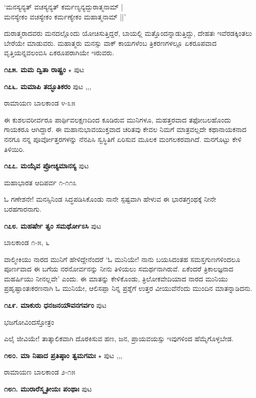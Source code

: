 {\begin{shloka}
`ಮನಸ್ಯನ್ಯತ್ ವಚಸ್ಯನ್ಯತ್ ಕರ್ಮಣ್ಯನ್ಯದ್ದುರಾತ್ಮನಾಮ್ |\\
ಮನಸ್ಯೇಕಂ ವಚಸ್ಯೇಕಂ ಕರ್ಮಣ್ಯೇಕಂ ಮಹಾತ್ಮನಾಮ್ ||'
\end{shloka}

ದುರಾತ್ಮರಾದವರು ಮನದಲ್ಲೊಂದು ಯೋಚಿಸುತ್ತಿದ್ದರೆ, ಬಾಯಲ್ಲಿ ಮತ್ತೊಂದನ್ನಾಡುತ್ತಿದ್ದು, ದೇಹತಃ ಇವೆರಡಕ್ಕಿಂತಲು ಬೇರೆಯೇ ಮಾಡುವರು. ಮಹಾತ್ಮರು ಮನಸ್ಸು ವಾಕ್ ಕಾಯಗಳೆಂಬ ತ್ರಿಕರಣಗಳಲ್ಲೂ ಏಕರೂಪವಾದ ವೃತ್ತಿಯನ್ನವಲಂಬಿಸಿ ಏಕರೂಪರಾಗಿಯೇ ಇರುವರು.

\medskip
\noindent\textbf{೧೭೫. ಮಮ ದ್ವಿತಾ ರಾಷ್ಟ್ರಂ} $\star$ \hfill ಪುಟ \pageref{148}

\medskip
\noindent\textbf{೧೭೬. ಮಮಾಪಿ ತದ್ಭೂತಿಕರಂ} \hfill ಪುಟ \pageref{159},\pageref{168},\pageref{193},\pageref{211}

\hfill ರಾಮಾಯಣ ಬಾಲಕಾಂಡ ೪-೩೫

ಈ ಕುಶಲವರೀರ್ವರೂ ಪಾರ್ಥಿವಲಕ್ಷಣದಿಂದ ಕೂಡಿರುವ ಮುನಿಗಳೂ, ಮಹತ್ತರವಾದ ತಫೋಬಲಹೊಂದು ಗಾಯಕರೂ ಆಗಿದ್ದಾರೆ. ಈ ಮಹಾನುಭಾವಯುಕ್ತವಾದ ಚರಿತವು ಕೇವಲ ನಿಮಗೆ ಮಾತ್ರವಲ್ಲದೇ ಕಥಾನಾಯಕನಾದ ನನಗೂ ನನ್ನ ಪೂರ್ವೋತ್ತರಗಳನ್ನು ನೆನಪಿಸಿ ಸ್ವಸ್ಥಿತಿಗೆ ಏರಿಸುವ ಮೂಲಕ ಮಂಗಲಕರವಾಗಿದೆ. ಮನಗೊಟ್ಟು ಕೇಳಿ ತಿಳಿಯಿರಿ.

\medskip
\noindent\textbf{೧೭೭. ಮಯೈವ ಪ್ರೋಚ್ಯಮಾನಸ್ಯ} \hfill ಪುಟ \pageref{119}

\hfill ಮಹಾಭಾರತ ಆದಿಪರ್ವ ೧-೧೧೩

ಓ ಗಣೇಶನೇ! ಮನಸ್ಸಿನಿಂಡ ಸಿದ್ಧಪಡಿಸಿಕೊಂಡು ನಾನೇ ಸ್ಪಷ್ಟವಾಗಿ ಹೇಳುವ ಈ ಭಾರತಗ್ರಂಥಕ್ಕೆ ನೀನೇ ಬರಹಗಾರನಾಗು.

\medskip
\noindent\textbf{೧೭೮. ಮಹರ್ಷೇ ತ್ವಂ ಸಮರ್ಥೋಽಸಿ} \hfill ಪುಟ \pageref{246}

\hfill ಬಾಲಕಾಂಡ ೧-೫, ೬

ವಾಲ್ಮೀಕಿಯು ನಾರದ ಮುನಿಗೆ ಹೇಳಿದ್ದೇನೆಂದರೆ `ಓ ಮುನಿಯೇ! ನಾನು ಬಯಸಿದಂತಹ ಸಮಸ್ತಗುಣಗಳಿಂದಲೂ ಪೂರ್ಣವಾದ ಈ ಬಗೆಯ ನರನೋರ್ವನನ್ನು ನೀನು ತಿಳಿಯಲು ಸಮರ್ಥನಾಗಿರುವೆ. ಏಕೆಂದರೆ ತ್ರಿಕಾಲಜ್ಞನಾದ ಮಹರ್ಷಿಯು ನೀನಲ್ಲವೇ' ಎಂದು. ಈ ಮಾತನ್ನು ಕೇಳಿಕೊಂಡು, ತ್ರಿಲೋಕವೇದಿಯಾದ ನಾರದ ಮುನಿಯು ಪ್ರಹೃಷ್ಟಾಂತಃಕರಣನಾಗಿ ಓ ಮುನಿಯೇ, ಆಲಿಸಪ್ಪಾ ನಿನ್ನ ಪ್ರಶ್ನೆಗೆ ಉತ್ತರ ವೀಯುವೆನೆಂದು ಮುಂದಿನ ಮಾತನ್ನಾಡಿದನು.

\medskip
\noindent\textbf{೧೭೯. ಮಾಕುರು ಧನಜನಯೌವನಗರ್ವಂ} \hfill ಪುಟ \pageref{60}

\hfill ಭಜಗೋವಿಂದಸ್ತೋತ್ರಂ 

ಎಲೈ ಜೀವಿಯೇ! ತಾತ್ಕಾಲಿಕವಾಗಿ ದೊರಕಿಸುವ ಹಣ, ಜನ, ಪ್ರಾಯವಯಸ್ಸು ಇವುಗಳಿಂದ ಹೆಮ್ಮೆಗೊಳ್ಳಬೇಡ.

\medskip
\noindent\textbf{೧೮೦. ಮಾ ನಿಷಾದ ಪ್ರತಿಷ್ಠಾಂ ತ್ವಮಗಮಃ} $\star$ \hfill ಪುಟ \pageref{20},\pageref{157},\pageref{166},\pageref{200}

\hfill ರಾಮಾಯಣ ಬಾಲಕಾಂಡ ೨-೧೫

\medskip
\noindent\textbf{೧೮೧. ಮುರಾರೆಸ್ಮೃತೀಯಃ ಪಂಥಾಃ} \hfill ಪುಟ \pageref{43}

}

